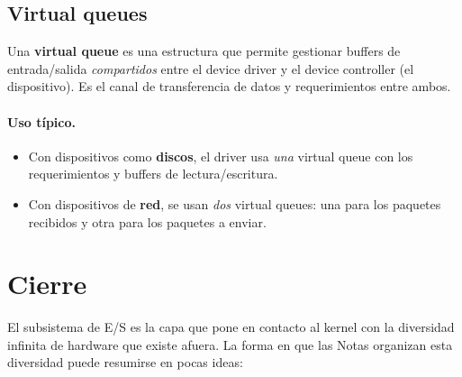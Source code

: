 \documentclass[11pt,a4paper]{article}
\begin{document}
\subsection{Virtual queues}

\begin{definicion}
Una \textbf{virtual queue} es una estructura que permite gestionar
buffers de entrada/salida \emph{compartidos} entre el device driver y
el device controller (el dispositivo). Es el canal de transferencia de
datos y requerimientos entre ambos.
\end{definicion}

\paragraph{Uso típico.}

\begin{itemize}[leftmargin=*]
    \item Con dispositivos como \textbf{discos}, el driver usa
        \emph{una} virtual queue con los requerimientos y buffers de
        lectura/escritura.
    \item Con dispositivos de \textbf{red}, se usan \emph{dos} virtual
        queues: una para los paquetes recibidos y otra para los
        paquetes a enviar.
\end{itemize}

\section{Cierre}

El subsistema de E/S es la capa que pone en contacto al kernel con la
diversidad infinita de hardware que existe afuera. La forma en que
las Notas organizan esta diversidad puede resumirse en pocas ideas:
\end{document}
